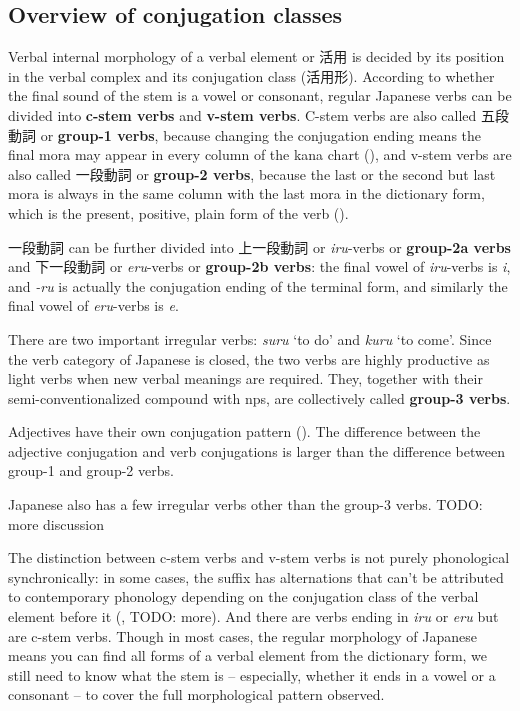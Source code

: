 \documentclass[UTF8, a4paper, oneside, scheme=plain]{ctexrep}
\newcommand*{\concept}[1]{\textbf{#1}}
\newcommand{\corpus}[1]{\emph{#1}}
\newcommand{\translate}[1]{`#1'}
\begin{document}
\subsection{Overview of conjugation classes}\label{sec:conjugation-class-overview}

Verbal internal morphology of a verbal element or 活用 
is decided by its position in the verbal complex 
and its conjugation class (活用形).
According to whether the final sound of the stem is a vowel or consonant,
regular Japanese verbs can be divided into \concept{c-stem verbs} and \concept{v-stem verbs}.
C-stem verbs are also called 五段動詞 or \concept{group-1 verbs},
because changing the conjugation ending means 
the final mora may appear in every column of the kana chart (), 
and v-stem verbs are also called 一段動詞 or \concept{group-2 verbs},
because the last or the second but last mora is always in the same column 
with the last mora in the dictionary form,
which is the present, positive, plain form of the verb ().

一段動詞 can be further divided into 上一段動詞 or \corpus{iru}-verbs or \concept{group-2a verbs} 
and 下一段動詞 or \corpus{eru}-verbs or \concept{group-2b verbs}:
the final vowel of \corpus{iru}-verbs is \corpus{i},
and \corpus{-ru} is actually the conjugation ending of the terminal form,
and similarly the final vowel of \corpus{eru}-verbs is \corpus{e}.

There are two important irregular verbs: \corpus{suru} \translate{to do} 
and \corpus{kuru} \translate{to come}.
Since the verb category of Japanese is closed,
the two verbs are highly productive as light verbs when new verbal meanings are required.
They, together with their semi-conventionalized compound with \ac{np}s,
are collectively called \concept{group-3 verbs}.

Adjectives have their own conjugation pattern ().
The difference between the adjective conjugation and verb conjugations 
is larger than the difference between group-1 and group-2 verbs.

Japanese also has a few irregular verbs other than the group-3 verbs. TODO: more discussion

The distinction between c-stem verbs and v-stem verbs is not purely phonological synchronically:
in some cases, the suffix has alternations that can't be attributed to contemporary phonology 
depending on the conjugation class of the verbal element before it
(, TODO: more).
And there are verbs ending in \corpus{iru} or \corpus{eru} but are c-stem verbs.
Though in most cases, the regular morphology of Japanese 
means you can find all forms of a verbal element from the dictionary form,
we still need to know what the stem is -- especially, whether it ends in a vowel or a consonant -- 
to cover the full morphological pattern observed.
\end{document}
